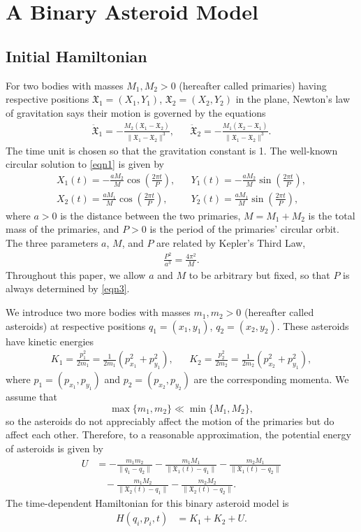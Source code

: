 \documentclass[12pt]{article}
\newcommand{\mf}{\mathfrak}
\begin{document}
\section{A Binary Asteroid Model}
\subsection{Initial Hamiltonian}
For two bodies with masses $M_1, M_2 > 0$ (hereafter called primaries) having respective positions $\mf{X}_1 = (X_1, Y_1)$, $\mf{X}_2 = (X_2, Y_2)$ in the plane, Newton's law of gravitation says their motion is governed by the equations
\begin{align}
\ddot{\mf{X}}_1 = -\frac{M_2(\mf{X}_1 - \mf{X}_2)}{\|\mf{X}_1 - \mf{X}_2\|^3},&  & \ddot{\mf{X}}_2 = -\frac{M_1(\mf{X}_2 - \mf{X}_1)}{\|\mf{X}_1 - \mf{X}_2\|^3}.
\label{eqn1}
\end{align}
The time unit is chosen so that the gravitation constant is 1. The well-known circular solution to \eqref{eqn1} is given by
\begin{align}
X_1(t) = -\frac{aM_2}{M}\cos\left(\frac{2\pi t}{P}\right), & & Y_1(t) = -\frac{aM_2}{M}\sin\left(\frac{2\pi t}{P}\right), \nonumber\\
X_2(t) = \frac{aM_1}{M}\cos\left(\frac{2\pi t}{P}\right), & & Y_2(t) = \frac{aM_1}{M}\sin\left(\frac{2\pi t}{P}\right),
\label{eqn2}
\end{align}
where $a > 0$ is the distance between the two primaries, $M = M_1 + M_2$ is the total mass of the primaries, and $P > 0$ is the period of the primaries' circular orbit. The three parameters $a$, $M$, and $P$ are related by Kepler's Third Law,
\begin{align}
    \frac{P^2}{a^3} = \frac{4\pi^2}{M}.
    \label{eqn3}
\end{align}
Throughout this paper, we allow $a$ and $M$ to be arbitrary but fixed, so that $P$ is always determined by \eqref{eqn3}.

We introduce two more bodies with masses $m_1, m_2 > 0$ (hereafter called asteroids) at respective positions $q_1 = (x_1, y_1)$, $q_2 = (x_2, y_2)$. These asteroids have kinetic energies
\begin{align*}
K_1 = \frac{p_1^2}{2m_1} = \frac{1}{2m_1}(p_{x_1}^2 + p_{y_1}^2), & & K_2 = \frac{p_2^2}{2m_2} = \frac{1}{2m_2}(p_{x_2}^2 + p_{y_1}^2),
\end{align*}
where $p_1 = (p_{x_1}, p_{y_1})$ and $p_2 = (p_{x_2}, p_{y_2})$ are the corresponding momenta. We assume that
\[ \max\{m_1, m_2\} \ll \min\{M_1,M_2\},\] 
so the asteroids do not appreciably affect the motion of the primaries but do affect each other. Therefore, to a reasonable approximation, the potential energy of asteroids is given by
\begin{align*}
U & = -\frac{m_1m_2}{\|q_1 - q_2\|} - \frac{m_1M_1}{\|\mf{X}_1(t) - q_1\|} - \frac{m_2M_1}{\|\mf{X}_1(t) - q_2\|} \\ 
& \ \ \ \ - \frac{m_1M_2}{\|\mf{X}_2(t) - q_1\|} - \frac{m_2M_2}{\|\mf{X}_2(t) - q_2\|}.
\end{align*}
The time-dependent Hamiltonian for this binary asteroid model is
\begin{align}
H(q_i,p_i,t) & = K_1 + K_2 + U.
\label{eqn4}
\end{align}
\end{document}
